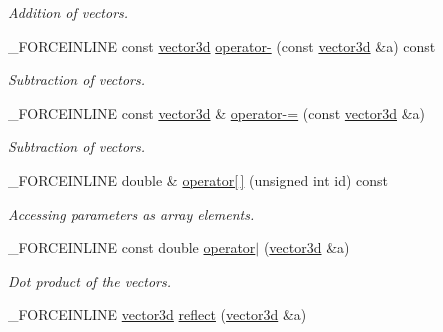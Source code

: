\begin{DoxyCompactItemize}
\begin{DoxyCompactList}\small\item\em Addition of vectors. \end{DoxyCompactList}\item 
\hypertarget{classbt_1_1vector3d_a8755780d3b07a01a5e3c7cb857ca69e3}{\-\_\-\-F\-O\-R\-C\-E\-I\-N\-L\-I\-N\-E const \hyperlink{classbt_1_1vector3d}{vector3d} \hyperlink{classbt_1_1vector3d_a8755780d3b07a01a5e3c7cb857ca69e3}{operator-\/} (const \hyperlink{classbt_1_1vector3d}{vector3d} \&a) const }\label{classbt_1_1vector3d_a8755780d3b07a01a5e3c7cb857ca69e3}

\begin{DoxyCompactList}\small\item\em Subtraction of vectors. \end{DoxyCompactList}\item 
\hypertarget{classbt_1_1vector3d_a861a168e0681d8137cc8a5b4a86dad3f}{\-\_\-\-F\-O\-R\-C\-E\-I\-N\-L\-I\-N\-E const \hyperlink{classbt_1_1vector3d}{vector3d} \& \hyperlink{classbt_1_1vector3d_a861a168e0681d8137cc8a5b4a86dad3f}{operator-\/=} (const \hyperlink{classbt_1_1vector3d}{vector3d} \&a)}\label{classbt_1_1vector3d_a861a168e0681d8137cc8a5b4a86dad3f}

\begin{DoxyCompactList}\small\item\em Subtraction of vectors. \end{DoxyCompactList}\item 
\hypertarget{classbt_1_1vector3d_a7ecfa8ca3fcfec49f2fe7ac63579aee6}{\-\_\-\-F\-O\-R\-C\-E\-I\-N\-L\-I\-N\-E double \& \hyperlink{classbt_1_1vector3d_a7ecfa8ca3fcfec49f2fe7ac63579aee6}{operator\mbox{[}$\,$\mbox{]}} (unsigned int id) const }\label{classbt_1_1vector3d_a7ecfa8ca3fcfec49f2fe7ac63579aee6}

\begin{DoxyCompactList}\small\item\em Accessing parameters as array elements. \end{DoxyCompactList}\item 
\hypertarget{classbt_1_1vector3d_ad8c7790c94ff7f4b562494d51af721bd}{\-\_\-\-F\-O\-R\-C\-E\-I\-N\-L\-I\-N\-E const double \hyperlink{classbt_1_1vector3d_ad8c7790c94ff7f4b562494d51af721bd}{operator$|$} (\hyperlink{classbt_1_1vector3d}{vector3d} \&a)}\label{classbt_1_1vector3d_ad8c7790c94ff7f4b562494d51af721bd}

\begin{DoxyCompactList}\small\item\em Dot product of the vectors. \end{DoxyCompactList}\item 
\hypertarget{classbt_1_1vector3d_a5b0a9d1ec866f41276db5e204d90f2b5}{\-\_\-\-F\-O\-R\-C\-E\-I\-N\-L\-I\-N\-E \hyperlink{classbt_1_1vector3d}{vector3d} \hyperlink{classbt_1_1vector3d_a5b0a9d1ec866f41276db5e204d90f2b5}{reflect} (\hyperlink{classbt_1_1vector3d}{vector3d} \&a)}\label{classbt_1_1vector3d_a5b0a9d1ec866f41276db5e204d90f2b5}


\end{DoxyCompactItemize}

